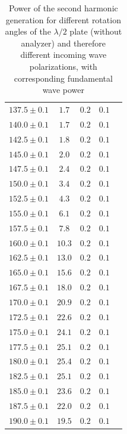 \documentclass{protokoll_en}
\begin{document}
\begin{appendix}
\begin{table}[H]
\begin{floatrow}
{\begin{tabular}{lcccc}
$137.5 \pm 0.1$ & $1.7$ & $0.2$ & $0.1$\\
$140.0 \pm 0.1$ & $1.7$ & $0.2$ & $0.1$\\
$142.5 \pm 0.1$ & $1.8$ & $0.2$ & $0.1$\\
$145.0 \pm 0.1$ & $2.0$ & $0.2$ & $0.1$\\
$147.5 \pm 0.1$ & $2.4$ & $0.2$ & $0.1$\\
$150.0 \pm 0.1$ & $3.4$ & $0.2$ & $0.1$\\
$152.5 \pm 0.1$ & $4.3$ & $0.2$ & $0.1$\\
$155.0 \pm 0.1$ & $6.1$ & $0.2$ & $0.1$\\
$157.5 \pm 0.1$ & $7.8$ & $0.2$ & $0.1$\\
$160.0 \pm 0.1$ & $10.3$ & $0.2$ & $0.1$\\
$162.5 \pm 0.1$ & $13.0$ & $0.2$ & $0.1$\\
$165.0 \pm 0.1$ & $15.6$ & $0.2$ & $0.1$\\
$167.5 \pm 0.1$ & $18.0$ & $0.2$ & $0.1$\\
$170.0 \pm 0.1$ & $20.9$ & $0.2$ & $0.1$\\
$172.5 \pm 0.1$ & $22.6$ & $0.2$ & $0.1$\\
$175.0 \pm 0.1$ & $24.1$ & $0.2$ & $0.1$\\
$177.5 \pm 0.1$ & $25.1$ & $0.2$ & $0.1$\\
$180.0 \pm 0.1$ & $25.4$ & $0.2$ & $0.1$\\
$182.5 \pm 0.1$ & $25.1$ & $0.2$ & $0.1$\\
$185.0 \pm 0.1$ & $23.6$ & $0.2$ & $0.1$\\
$187.5 \pm 0.1$ & $22.0$ & $0.2$ & $0.1$\\
$190.0 \pm 0.1$ & $19.5$ & $0.2$ & $0.1$\\
\bottomrule
\end{tabular}
}
\end{floatrow}
\caption{Power of the second harmonic generation for different rotation angles of the $\lambda / 2$ plate (without analyzer) and therefore different incoming wave polarizations, with corresponding fundamental wave power}
  \label{tab:ana_pol_dep}
\end{table}

\end{appendix}
\end{document}
